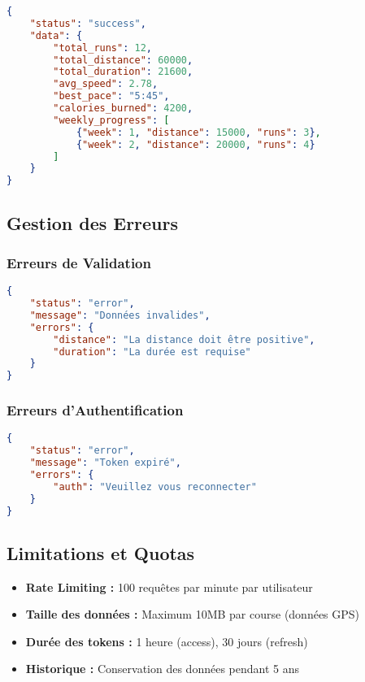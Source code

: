 \begin{lstlisting}[language=json]
{
    "status": "success",
    "data": {
        "total_runs": 12,
        "total_distance": 60000,
        "total_duration": 21600,
        "avg_speed": 2.78,
        "best_pace": "5:45",
        "calories_burned": 4200,
        "weekly_progress": [
            {"week": 1, "distance": 15000, "runs": 3},
            {"week": 2, "distance": 20000, "runs": 4}
        ]
    }
}
\end{lstlisting}

\subsection{Gestion des Erreurs}

\subsubsection{Erreurs de Validation}

\begin{lstlisting}[language=json]
{
    "status": "error",
    "message": "Données invalides",
    "errors": {
        "distance": "La distance doit être positive",
        "duration": "La durée est requise"
    }
}
\end{lstlisting}

\subsubsection{Erreurs d'Authentification}

\begin{lstlisting}[language=json]
{
    "status": "error",
    "message": "Token expiré",
    "errors": {
        "auth": "Veuillez vous reconnecter"
    }
}
\end{lstlisting}

\subsection{Limitations et Quotas}

\begin{itemize}
    \item \textbf{Rate Limiting :} 100 requêtes par minute par utilisateur
    \item \textbf{Taille des données :} Maximum 10MB par course (données GPS)
    \item \textbf{Durée des tokens :} 1 heure (access), 30 jours (refresh)
    \item \textbf{Historique :} Conservation des données pendant 5 ans
\end{itemize}